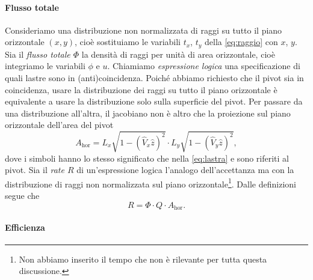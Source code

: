 \paragraph{Flusso totale}

Consideriamo una distribuzione non normalizzata di raggi su tutto il piano orizzontale $(x,y)$,
cioè sostituiamo le variabili $t_x$, $t_y$ della \eqref{eq:raggio} con $x$, $y$.
Sia il \emph{flusso totale $\Phi$} la densità di raggi per unità di area orizzontale,
cioè integriamo le variabili $\phi$ e $u$.
Chiamiamo \emph{espressione logica} una specificazione di quali lastre sono in (anti)coincidenza.
Poiché abbiamo richiesto che il pivot sia in coincidenza,
usare la distribuzione dei raggi su tutto il piano orizzontale è equivalente
a usare la distribuzione solo sulla superficie del pivot.
Per passare da una distribuzione all'altra,
il jacobiano non è altro che la proiezione sul piano orizzontale dell'area del pivot
\begin{equation*}
	A_\text{hor} = L_x \sqrt{1-(\hat V_x\hat z)^2} \cdot L_y \sqrt{1-(\hat V_y\hat z)^2},
\end{equation*}
dove i simboli hanno lo stesso significato che nella \eqref{eq:lastra}
e sono riferiti al pivot.
Sia il \emph{rate $R$} di un'espressione logica l'analogo dell'accettanza
ma con la distribuzione di raggi non normalizzata sul piano orizzontale\footnote{Non abbiamo inserito il tempo che non è rilevante per tutta questa discussione.}.
Dalle definizioni segue che
\begin{equation}
	\label{eq:rate}
	R = \Phi \cdot Q \cdot A_\text{hor}.
\end{equation}

\paragraph{Efficienza}

